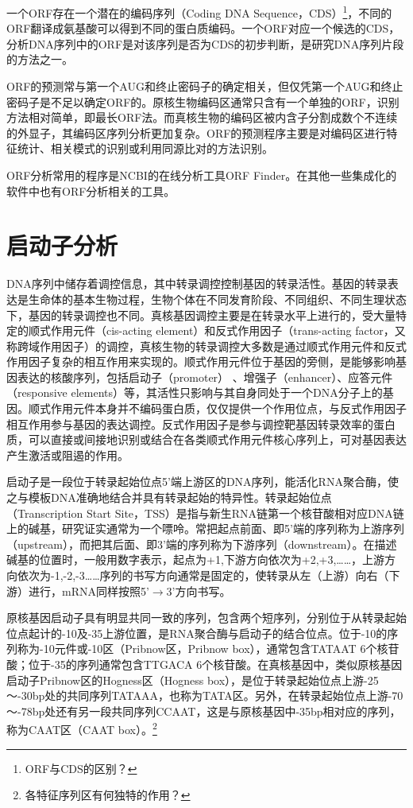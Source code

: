 \documentclass[11pt,a4paper,twoside]{book}
\begin{document}
一个ORF存在一个潜在的编码序列（Coding DNA Sequence，CDS）\footnote{ORF与CDS的区别？}，不同的ORF翻译成氨基酸可以得到不同的蛋白质编码。一个ORF对应一个候选的CDS，分析DNA序列中的ORF是对该序列是否为CDS的初步判断，是研究DNA序列片段的方法之一。

ORF的预测常与第一个AUG和终止密码子的确定相关，但仅凭第一个AUG和终止密码子是不足以确定ORF的。原核生物编码区通常只含有一个单独的ORF，识别方法相对简单，即最长ORF法。而真核生物的编码区被内含子分割成数个不连续的外显子，其编码区序列分析更加复杂。ORF的预测程序主要是对编码区进行特征统计、相关模式的识别或利用同源比对的方法识别。

ORF分析常用的程序是NCBI的在线分析工具ORF Finder。在其他一些集成化的软件中也有ORF分析相关的工具。

\section{启动子分析}
DNA序列中储存着调控信息，其中转录调控控制基因的转录活性。基因的转录表达是生命体的基本生物过程，生物个体在不同发育阶段、不同组织、不同生理状态下，基因的转录调控也不同。真核基因调控主要是在转录水平上进行的，受大量特定的顺式作用元件（cis-acting element）和反式作用因子（trans-acting factor，又称跨域作用因子）的调控，真核生物的转录调控大多数是通过顺式作用元件和反式作用因子复杂的相互作用来实现的。顺式作用元件位于基因的旁侧，是能够影响基因表达的核酸序列，包括启动子（promoter） 、增强子（enhancer）、应答元件（responsive elements）等，其活性只影响与其自身同处于一个DNA分子上的基因。顺式作用元件本身并不编码蛋白质，仅仅提供一个作用位点，与反式作用因子相互作用参与基因的表达调控。反式作用因子是参与调控靶基因转录效率的蛋白质，可以直接或间接地识别或结合在各类顺式作用元件核心序列上，可对基因表达产生激活或阻遏的作用。

启动子是一段位于转录起始位点5'端上游区的DNA序列，能活化RNA聚合酶，使之与模板DNA准确地结合并具有转录起始的特异性。转录起始位点（Transcription Start Site，TSS）是指与新生RNA链第一个核苷酸相对应DNA链上的碱基，研究证实通常为一个嘌呤。常把起点前面、即5'端的序列称为上游序列（upstream），而把其后面、即3'端的序列称为下游序列（downstream）。在描述碱基的位置时，一般用数字表示，起点为+1,下游方向依次为+2,+3,……，上游方向依次为-1,-2,-3……序列的书写方向通常是固定的，使转录从左（上游）向右（下游）进行，mRNA同样按照5'$\rightarrow$3'方向书写。

原核基因启动子具有明显共同一致的序列，包含两个短序列，分别位于从转录起始位点起计的-10及-35上游位置，是RNA聚合酶与启动子的结合位点。位于-10的序列称为-10元件或-10区（Pribnow区，Pribnow box），通常包含TATAAT 6个核苷酸；位于-35的序列通常包含TTGACA 6个核苷酸。在真核基因中，类似原核基因启动子Pribnow区的Hogness区（Hogness box），是位于转录起始位点上游-25～-30bp处的共同序列TATAAA，也称为TATA区。另外，在转录起始位点上游-70～-78bp处还有另一段共同序列CCAAT，这是与原核基因中-35bp相对应的序列，称为CAAT区（CAAT box）。\footnote{各特征序列区有何独特的作用？}
\end{document}
